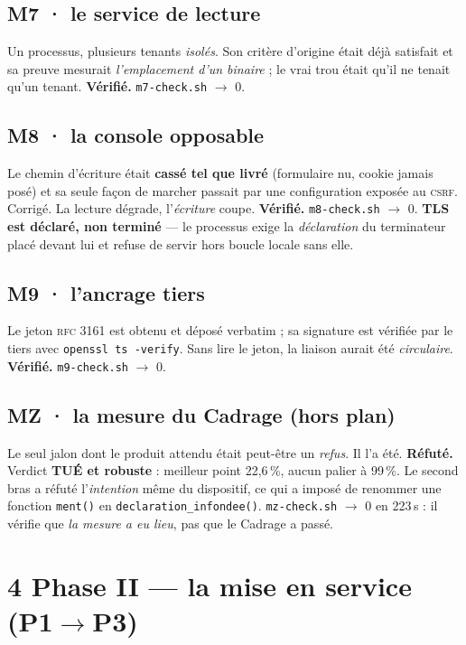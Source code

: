 \documentclass[11pt]{article}
\newcommand{\code}[1]{\texttt{\small #1}}
\newcommand{\pire}[1]{{\color{efered}\textbf{#1}}}
\newcommand{\moyen}[1]{{\color{efeamber}\textbf{#1}}}
\newcommand{\mm}[1]{\textbf{#1}}
\newcommand{\sz}[1]{{\small #1}}
\newcommand{\mesure}[1]{{\color{efeteal}\textbf{Vérifié.} }#1\par}
\newcommand{\refute}[1]{{\color{efered}\textbf{Réfuté.} }#1\par}
\begin{document}
\subsection{\mm{M7} · le service de lecture}
Un processus, plusieurs tenants \emph{isolés}. Son critère d'origine était déjà satisfait et sa
preuve mesurait \emph{l'emplacement d'un binaire} ; le vrai trou était qu'il ne tenait qu'un tenant.
\mesure{\code{m7-check.sh} $\rightarrow$ 0.}

\subsection{\mm{M8} · la console opposable}
Le chemin d'écriture était \pire{cassé tel que livré} (formulaire nu, cookie jamais posé) et sa seule
façon de marcher passait par une configuration exposée au \textsc{csrf}. Corrigé. La lecture dégrade,
l'\emph{écriture} coupe.
\mesure{\code{m8-check.sh} $\rightarrow$ 0. \moyen{TLS est déclaré, non terminé} --- le processus
exige la \emph{déclaration} du terminateur placé devant lui et refuse de servir hors boucle locale
sans elle.}

\subsection{\mm{M9} · l'ancrage tiers}
Le jeton \textsc{rfc 3161} est obtenu et déposé verbatim ; sa signature est vérifiée par le tiers
avec \code{openssl ts -verify}. Sans lire le jeton, la liaison aurait été \emph{circulaire}.
\mesure{\code{m9-check.sh} $\rightarrow$ 0.}

\subsection{\mm{MZ} · la mesure du Cadrage \sz{(hors plan)}}
Le seul jalon dont le produit attendu était peut-être un \emph{refus}. Il l'a été.
\refute{Verdict \pire{TUÉ et robuste} : meilleur point 22{,}6\,\%, aucun palier à 99\,\%. Le second
bras a réfuté l'\emph{intention} même du dispositif, ce qui a imposé de renommer une fonction
\code{ment()} en \code{declaration\_infondee()}. \code{mz-check.sh} $\rightarrow$ 0 en 223\,s : il
vérifie que \emph{la mesure a eu lieu}, pas que le Cadrage a passé.}

\section{4 \;\textbar\; Phase II --- la mise en service (\mm{P1}$\rightarrow$\mm{P3})}
\end{document}
